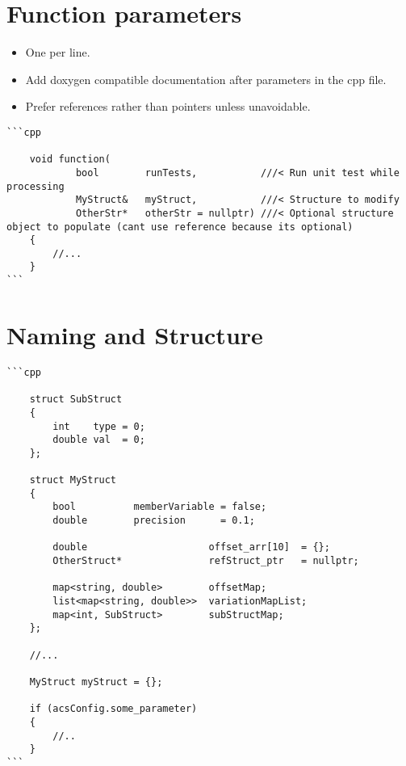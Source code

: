 \section{Function parameters}

\begin{itemize}
\item One per line.
\item Add doxygen compatible documentation after parameters in the cpp file.
\item Prefer references rather than pointers unless unavoidable.
\end{itemize}

\begin{verbatim}
```cpp

    void function(
            bool        runTests,           ///< Run unit test while processing
            MyStruct&   myStruct,           ///< Structure to modify
            OtherStr*	otherStr = nullptr)	///< Optional structure object to populate (cant use reference because its optional)
    {
    	//...
    }
```
\end{verbatim}

\section{Naming and Structure}
\begin{verbatim}
```cpp

    struct SubStruct
    {
        int    type = 0;
        double val  = 0;
    };

    struct MyStruct
    {
        bool          memberVariable = false;
        double        precision      = 0.1;

        double                     offset_arr[10]  = {};
        OtherStruct*               refStruct_ptr   = nullptr;

        map<string, double>        offsetMap; 
        list<map<string, double>>  variationMapList;
        map<int, SubStruct>        subStructMap;
    };

    //...

    MyStruct myStruct = {};

    if (acsConfig.some_parameter)
    {
        //..
    }
```
\end{verbatim}
